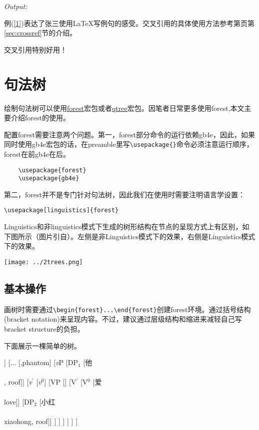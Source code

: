 \documentclass[a4paper,12pt]{article}
\begin{document}
\vspace{3mm}
\textit{Output:}

例(\ref{1})表达了张三使用LaTeX写例句的感受。交叉引用的具体使用方法参考第\pageref{sec:crossref}页第\ref{sec:crossref}节的介绍。
\begin{exe}
	\ex \label{1}
	交叉引用特别好用！
\end{exe}

\section{句法树}

绘制句法树可以使用\href{https://ctan.org/pkg/forest}{forest}宏包或者\href{https://www.ctan.org/pkg/qtree}{qtree}宏包。因笔者日常更多使用forest,本文主要介绍forest的使用。

配置forest需要注意两个问题。第一，forest部分命令的运行依赖gb4e，因此，如果同时使用gb4e宏包的话，在preamble里写\verb|\usepackage{}|命令必须注意运行顺序，forest在前gb4e在后。

\begin{verbatim}
	\usepackage{forest}
	\usepackage{gb4e}
\end{verbatim}

第二，forest并不是专门针对句法树，因此我们在使用时需要注明语言学设置：

\verb|\usepackage[linguistics]{forest}|

\vspace{3mm}
Linguistics和非linguistics模式下生成的树形结构在节点的呈现方式上有区别，如下图所示（图片引自）。左侧是非Linguistics模式下的效果，右侧是Linguistics模式下的效果。

\begin{center}
	\texttt{[image: ../2trees.png]}
\end{center}


\subsection{基本操作}

画树时需要通过\verb|\begin{forest}...\end{forest}|创建forest环境。通过括号结构(bracket notation)来呈现内容。不过，建议通过层级结构和缩进来减轻自己写bracket structure的负担。


\vspace{3mm}
下面展示一棵简单的树。

\begin{center}
	\begin{forest}
		[TP
		[T$^{0}$ [$\emptyset$]]
		[$\dots$
		[,phantom]
		[\textit{v}P
		[DP$_1$ [他\\\\ \Tsg{}, roof]]
		[\textit{v}$^{\prime}$
		[\textit{v}$^{0}$]
		[VP
		[]
		[V$^{\prime}$
		[V$^{0}$ [爱\\\\love]]
		[DP$_2$ [小红\\\\xiaohong, roof]]
		]	
		]	
		]
		]
		]
		]	
	\end{forest}
\end{center}
\end{document}
